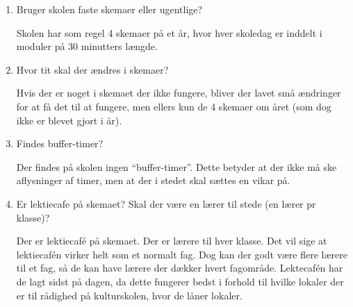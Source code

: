 \begin{enumerate}
	I år tog det meget lang tid, da de var 60 ansatte om det. Der var på forhånd bestemt nogle få ting, såsom at 1. klasse skulle have billedkunst om mandagen, men alle de små detaljer og præcise tidspunkter skulle der opnås enighed om. Planen var oprindeligt at det skulle tage 3-4 timer at nå frem til det skema, reelt tog det dog omkring 8 timer, for de 60 mennesker. 

	Tanken var også oprindeligt at der i løbet af et år skulle være 4 skemaer. Grundet at det tog så lang tid at lægge skemaet, og at det var et meget stort arbejde, er der ingen der har taget initiativ til at der skulle lægges et nyt, da der var gået 1/4 af skoleåret. Derfor bliver der enten kun 2 skemaer i løbet af året, eller i værste fald kun dette ene.

	Skolen har eksperimenteret med fagdage, altså hvor en hel dag var sat af til et enkelt fag. Erfaringerne fra dette var dog at det førte til meget spildtid, og at lærerene blev meget frustreret over det.

	Til at holde styr på timeantal for lærere og elever, har de tidligere brugt Microsoft Excel.

	
	\item Bruger skolen faste skemaer eller ugentlige?

	Skolen har som regel 4 skemaer på et år, hvor hver skoledag er inddelt i moduler på 30 minutters længde.

	\item Hvor tit skal der ændres i skemaer?

	Hvis der er noget i skemaet der ikke fungere, bliver der lavet små ændringer for at få det til at fungere, men ellers kun de 4 skemaer om året (som dog ikke er blevet gjort i år).


	\item Findes buffer-timer? 

	Der findes på skolen ingen ``buffer-timer''. Dette betyder at der ikke må ske aflysninger af timer, men at der i stedet skal sættes en vikar på.


	\item Er lektiecafe på skemaet? Skal der være en lærer til stede (en lærer pr klasse)?

	Der er lektiecaf\'e på skemaet. Der er lærere til hver klasse. Det vil sige at lektiecaf\'en virker helt som et normalt fag. Dog kan der godt være flere lærere til et fag, så de kan have lærere der dækker hvert fagområde. Lektecaf\'en har de lagt sidst på dagen, da dette fungerer bedst i forhold til hvilke lokaler der er til rådighed på kulturskolen, hvor de låner lokaler.


\end{enumerate}
